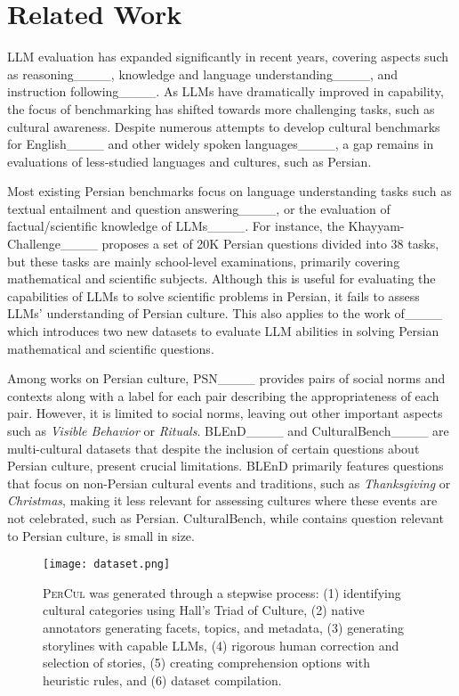 \section{Related Work}
LLM evaluation has expanded significantly in recent years, covering aspects such as reasoning____, knowledge and language understanding____, and instruction following____. As LLMs have dramatically improved in capability, the focus of benchmarking has shifted towards more challenging tasks, such as cultural awareness. Despite numerous attempts to develop cultural benchmarks for English____ and other widely spoken languages____, a gap remains in evaluations of less-studied languages and cultures, such as Persian.

Most existing Persian benchmarks focus on language understanding tasks such as textual entailment and question answering____, or the evaluation of factual/scientific knowledge of LLMs____. 
For instance, the Khayyam-Challenge____ proposes a set of 20K Persian questions divided into 38 tasks, but these tasks are mainly school-level examinations, primarily covering mathematical and scientific subjects. Although this is useful for evaluating the capabilities of LLMs to solve scientific problems in Persian, it fails to assess LLMs' understanding of Persian culture. This also applies to the work of____ which introduces two new datasets to evaluate LLM abilities in solving Persian mathematical and scientific questions.

Among works on Persian culture, PSN____ provides pairs of social norms and contexts along with a label for each pair describing the appropriateness of each pair. However, it is limited to social norms, leaving out other important aspects such as \textit{Visible Behavior} or \textit{Rituals}. BLEnD____ and CulturalBench____ are multi-cultural datasets that despite the inclusion of certain questions about Persian culture, present crucial limitations. BLEnD primarily features questions that focus on non-Persian cultural events and traditions, such as {\it Thanksgiving} or {\it Christmas}, making it less relevant for assessing cultures where these events are not celebrated, such as Persian. CulturalBench, while contains question relevant to Persian culture, is small in size.


\begin{figure*}[!ht]
  \centering
  \texttt{[image: dataset.png]}
  \caption{\textsc{PerCul} was generated through a stepwise process: (1) identifying cultural categories using Hall's Triad of Culture, (2) native annotators generating facets, topics, and metadata, (3) generating storylines with capable LLMs, (4) rigorous human correction and selection of stories, (5) creating comprehension options with heuristic rules, and (6) dataset compilation.}
  \label{fig:dataset_generation}
\end{figure*}